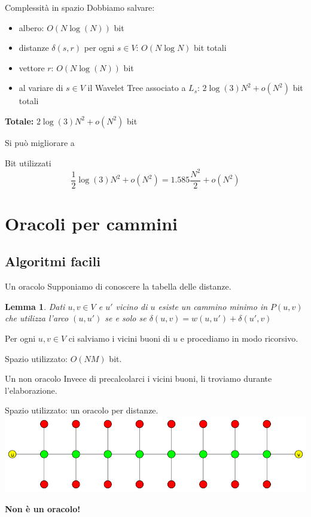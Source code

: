 \documentclass{beamer}
\newcounter{counter1}
\theoremstyle{plain}
\newtheorem{mylem}[counter1]{Lemma}
\theoremstyle{definition}
\theoremstyle{remark}
\newcommand{\pa}[1]{\left(#1\right)}
\begin{document}
\begin{frame}{Complessità in spazio}
  Dobbiamo salvare:
  \begin{itemize}
  \item albero: $O\pa{N\log\pa{N}}$ bit
  \item distanze $\delta\pa{s,r}$ per ogni $s\in V$: $O\pa{ N \log N}$
    bit totali
  \item vettore $r$: $O\pa{N \log\pa{N}}$ bit 
  \item al variare di $s\in V$ il Wavelet Tree associato a $L_s$:
    $2\log\pa{3} N^2 + o(N^2)$ bit totali
  \end{itemize}
  \textbf{Totale:} ${2}\log\pa{3} N^2 + o(N^2)$ bit
  \vfill
  \pause

  Si pu\`o migliorare a 
  \begin{block}{Bit utilizzati}
    \[ \frac{1}{2}\log\pa{3} N^2 + o\pa{N^2} = 1.585 \frac{N^2}{2} +
    o\pa{N^2} \]
  \end{block}
\end{frame}


\section{Oracoli per cammini}

\subsection{Algoritmi facili}

\begin{frame}{Un oracolo}
  Supponiamo di conoscere la tabella delle distanze.
  \begin{mylem}
    Dati $u,v \in V$ e $u'$ vicino di $u$ esiste un cammino minimo in
    $P(u,v)$ che utilizza l'arco $(u,u')$ se e solo se $ \delta \pa{
      u,v} = w\pa{ u,u' } + \delta \pa{ u',v} $
  \end{mylem}
  \pause
  Per ogni $u,v\in V$ ci salviamo i vicini buoni di $u$ e procediamo
  in modo ricorsivo.
  \vfill \pause

  Spazio utilizzato: $O\pa{NM}$ bit.
\end{frame}

\begin{frame}{Un non oracolo}
  Invece di precalcolarci i vicini buoni, li troviamo durante
  l'elaborazione.
  
  Spazio utilizzato: un oracolo per distanze.
  \vfill
  \pause
  \includegraphics[width=\textwidth]{millepiedi}
  
  \begin{center}
    \textbf{Non \`e un oracolo!}
  \end{center}
\end{frame}
\end{document}
